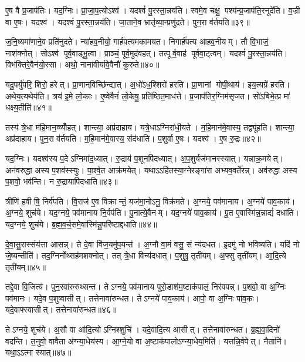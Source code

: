 ए॒ष वै प्र॒जाप॑तिः। यद॒ग्निः। प्रा॒जा॒प॒त्योऽश्व॑। यदश्वं॑ पु॒रस्ता॒न्नय॑ति। स्वमे॒व चक्षु॒ पश्य॑न्प्र॒जाप॑ति॒रनूदे॑ति। व॒ज्री वा ए॒षः। यदश्व॑। यदश्वं॑ पु॒रस्ता॒न्नय॑ति। जा॒ताने॒व भ्रातृ॑व्या॒न्प्रणु॑दते। पुन॒रा व॑र्तयति॥३९॥

ज॒नि॒ष्यमा॑णाने॒व प्रति॑नुदते। न्या॑हव॒नीयो॒ गार्\mbox{}ह॑पत्यमकामयत। निगार्\mbox{}ह॑पत्य आहव॒नीयम्। तौ वि॒भाजं॒ नाश॑क्नोत्। सोऽश्व॑ पूर्व॒वाड्भू॒त्वा। प्राञ्चं॒ पूर्व॒मुद॑वहत्। तत्पूर्व॒वाह॑ पूर्ववा॒ट्त्वम्। यदश्वं॑ पु॒रस्ता॒न्नय॑ति। विभ॑क्तिरे॒वैन॑यो॒स्सा। अथो॒ नाना॑वीर्यावे॒वैनौ॑ कुरुते॥४०॥

यदु॒पर्यु॑परि॒ शिरो॒ हरेत्। प्रा॒णान्‌विच्छि॑न्द्यात्। अ॒धो॑ऽध॒श्शिरो॑ हरति। प्रा॒णानां गोपी॒थाय॑। इय॒त्यग्रे॑ हरति। अथेय॒त्यथेय॑ति। त्रय॑ इ॒मे लो॒काः। ए॒ष्वे॑वैनं॑ लो॒केषु॒ प्रति॑ष्ठित॒माध॑त्ते। प्र॒जाप॑तिर॒ग्निम॑सृजत। सो॑ऽबिभे॒त्प्र मा॑ धक्ष्य॒तीति॑॥४१॥

तस्य॑ त्रे॒धा म॑हि॒मान॒व्व्यौँ॑हत्। शान्त्या॒ अप्र॑दाहाय। यत्रे॒धाऽग्निरा॑धी॒यते। म॒हि॒मान॑मे॒वास्य॒ तद्व्यू॑हति। शान्त्या॒ अप्र॑दाहाय। पुन॒रा व॑र्तयति। म॒हि॒मान॑मे॒वास्य॒ संद॑धाति। प॒शुर्वा ए॒षः। यदश्व॑। ए॒ष रु॒द्रः॥४२॥

यद॒ग्निः। यदश्व॑स्य प॒देऽग्निमा॑द॒ध्यात्। रु॒द्राय॑ प॒शूनपि॑दध्यात्। अ॒प॒शुर्यज॑मानस्स्यात्। यन्नाक्र॒मयेत्। अन॑वरुद्धा अस्य प॒शव॑स्स्युः। पा॒र्श्व॒त आक्र॑मयेत्। यथाऽऽहि॑तस्या॒ग्नेरङ्गा॑रा अभ्यव॒वर्ते॑रन्न्। अव॑रुद्धा अस्य प॒शवो॒ भव॑न्ति। न रु॒द्रायापि॑दधाति॥४३॥

त्रीणि॑ ह॒वीषि॒ निर्व॑पति। वि॒राज॑ ए॒व विक्रान्तं॒ यज॑मा॒नोऽनु॒ विक्र॑मते। अ॒ग्नये॒ पव॑मानाय। अ॒ग्नये॑ पाव॒काय॑। अ॒ग्नये॒ शुच॑ये। यद॒ग्नये॒ पव॑मानाय नि॒र्वप॑ति। पु॒नात्ये॒वैनम्। यद॒ग्नये॑ पाव॒काय॑। पू॒त ए॒वास्मि॑न्न॒न्नाद्यं॑ दधाति। यद॒ग्नये॒ शुच॑ये। ब्र॒ह्म॒व॒र्च॒समे॒वास्मि॑न्नु॒परि॑ष्टाद्दधाति॥४४॥\anuvakamend[ए॒न॒मा॒ह॒व॒नीयं॑ धत्तेऽश्व॒त्वं व॑र्तयति कुरुत॒ इति॑ रु॒द्रो द॑धाति॒ य॒दग्नये॒ शुच॑य॒ एकं॑ च]

दे॒वा॒सु॒रास्संय॑त्ता आसन्न्। ते दे॒वा वि॑ज॒यमु॑प॒यन्त॑। अ॒ग्नौ वा॒मं वसु॒ सं न्य॑दधत। इ॒दमु॑ नो भविष्यति। यदि॑ नो जे॒ष्यन्तीति॑। तद॒ग्निर्नोथ्सह॑मशक्नोत्। तत् त्रे॒धा विन्य॑दधात्। प॒शुषु॒ तृती॑यम्। अ॒फ्सु तृती॑यम्। आ॒दि॒त्ये तृती॑यम्॥४५॥

तद्दे॒वा वि॒जित्य॑। पुन॒रवा॑रुरुथ्सन्त। तेऽग्नये॒ पव॑मानाय पुरो॒डाश॑म॒ष्टाक॑पालं॒ निर॑वपन्न्। प॒शवो॒ वा अ॒ग्निः पव॑मानः। यदे॒व प॒शुष्वासीत्। तत्तेनावा॑रुन्धत। तेऽग्नये॑ पाव॒काय॑। आपो॒ वा अ॒ग्निः पा॑व॒कः। यदे॒वाफ्स्वासीत्। तत्तेनावा॑रुन्धत॥४६॥

तेऽग्नये॒ शुच॑ये। अ॒सौ वा आ॑दि॒त्योऽग्निश्शुचि॑। यदे॒वादि॒त्य आसीत्। तत्तेनावा॑रुन्धत। ब्र॒ह्म॒वा॒दिनो॑ वदन्ति। त॒नुवो॒ वावैता अ॑ग्न्या॒धेय॑स्य। आ॒ग्ने॒यो वा अ॒ष्टाक॑पालोऽग्न्या॒धेय॒मिति॑। यत्तन्नि॒र्वपेत्। नैतानि॑। यथा॒ऽऽत्मा स्यात्॥४७॥

